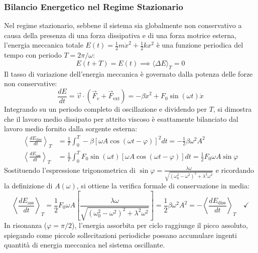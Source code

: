 \subsubsection*{Bilancio Energetico nel Regime Stazionario}
Nel regime stazionario, sebbene il sistema sia globalmente non conservativo a causa della presenza di una forza dissipativa e di una forza motrice esterna, l'energia meccanica totale $E(t) = \frac{1}{2}m\dot{x}^2 + \frac{1}{2}kx^2$ è una funzione periodica del tempo con periodo $T = 2\pi/\omega$:
\begin{equation}
    E(t+T) = E(t) \implies \langle \Delta E \rangle_T = 0
\end{equation}
Il tasso di variazione dell'energia meccanica è governato dalla potenza delle forze non conservative:
\begin{equation}
    \frac{dE}{dt} = \vec{v} \cdot (\vec{F}_v + \vec{F}_{\text{ext}}) = -\beta \dot{x}^2 + F_0 \sin(\omega t)\dot{x}
\end{equation}
Integrando su un periodo completo di oscillazione e dividendo per $T$, si dimostra che il lavoro medio dissipato per attrito viscoso è esattamente bilanciato dal lavoro medio fornito dalla sorgente esterna:
\begin{align*}
\left\langle \frac{dE_{\text{diss}}}{dt} \right\rangle_T &= \frac{1}{T} \int_0^T -\beta \left[ \omega A \cos(\omega t - \varphi) \right]^2 dt = -\frac{1}{2}\beta \omega^2 A^2 \\
\left\langle \frac{dE_{\text{ass}}}{dt} \right\rangle_T &= \frac{1}{T} \int_0^T F_0 \sin(\omega t) \left[ \omega A \cos(\omega t - \varphi) \right] dt = \frac{1}{2} F_0 \omega A \sin\varphi
\end{align*}
Sostituendo l'espressione trigonometrica di $\sin\varphi = \frac{\lambda\omega}{\sqrt{(\omega_0^2 - \omega^2)^2 + \lambda^2\omega^2}}$ e ricordando la definizione di $A(\omega)$, si ottiene la verifica formale di conservazione in media:
\begin{equation}
    \left\langle \frac{dE_{\text{ass}}}{dt} \right\rangle_T = \frac{1}{2} F_0 \omega A \left[ \frac{\lambda \omega}{\sqrt{(\omega_0^2 - \omega^2)^2 + \lambda^2\omega^2}} \right] = \frac{1}{2} \beta \omega^2 A^2 = -\left\langle \frac{dE_{\text{diss}}}{dt} \right\rangle_T \quad \checkmark
\end{equation}
In risonanza ($\varphi = \pi/2$), l'energia assorbita per ciclo raggiunge il picco assoluto, spiegando come piccole sollecitazioni periodiche possano accumulare ingenti quantità di energia meccanica nel sistema oscillante.

